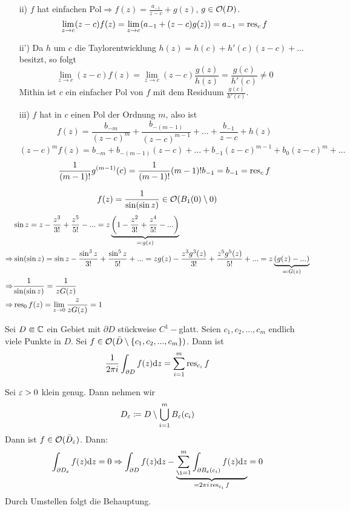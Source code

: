 \begin{beweis}
	\begin{enumerate}
		\item[ii)] $ f $ hat einfachen Pol$ \Rightarrow f(z)=\frac{a_{-1}}{z-c}+g(z) $, $ g\in\mathcal O(D) $.
		\[ \lim_{z\to c}(z-c) f(z)=\lim_{z\to c}(a_{-1}+(z-c)g(z))=a_{-1}=\operatorname{res}_c f \]
		\item[ii')] Da $ h $ um $ c $ die Taylorentwicklung $ h(z)=h(c)+h'(c)(z-c)+... $ besitzt, so folgt
		\[ \lim_{z\to c}(z-c)f(z)=\lim_{z\to c}(z-c)\frac{g(z)}{h(z)}=\frac{g(c)}{h'(c)}\neq 0 \]
		Mithin ist $ c $ ein einfacher Pol von $ f $ mit dem Residuum $ \frac{g(c)}{h'(c)} $.
		\item[iii)] $ f $ hat in $ c $ einen Pol der Ordnung $ m $, also ist
		\[ f(z)=\frac{b_{-m}}{(z-c)^m}+\frac{b_{-(m-1)}}{(z-c)^{m-1}}+...+\frac{b_{-1}}{z-c}+h(z) \]
		\[ (z-c)^m f(z)=b_{-m}+b_{-(m-1)}(z-c)+...+b_{-1}(z-c)^{m-1}+b_0(z-c)^m+... \]
		\[ \frac{1}{(m-1)!}g^{(m-1)}(c)=\frac{1}{(m-1)!}(m-1)!b_{-1}=b_{-1}=\operatorname{res}_c f \]
	\end{enumerate}\vspace{-22pt}
\end{beweis}
\begin{beispiel*}
	\[ f(z)=\frac{1}{\sin(\sin z)}\in\mathcal O(B_1(0)\setminus 0) \]
	\begin{align*} &\sin z=z-\frac{z^3}{3!}+\frac{z^5}{5!}-...=z\underbrace{\left(1-\frac{z^2}{3!}+\frac{z^4}{5!}-...\right)}_{\eqqcolon g(z)}\\\Rightarrow&\sin(\sin z)=\sin z-\frac{\sin^3 z}{3!}+\frac{\sin^5 z}{5!}+...=zg(z)-\frac{z^3g^3(z)}{3!}+\frac{z^5g^5(z)}{5!}+...=z\underbrace{(g(z)-...)}_{\eqqcolon G(z)}\\\Rightarrow&\frac{1}{\sin(\sin z)}=\frac{1}{zG(z)}\\\Rightarrow& \operatorname{res}_0 f(z)=\lim_{z\to 0}\frac{z}{zG(z)}=1 \end{align*}
\end{beispiel*}
\begin{satz}[Residuensatz]
	Sei $ D\Subset\mathbb{C} $ ein Gebiet mit $ \partial D $ st\"uckweise $ C^1- $glatt. Seien $ c_1,c_2,...,c_m $ endlich viele Punkte in $ D $. Sei $ f\in\mathcal O(\bar D\setminus\lbrace c_1,c_2,...,c_m\rbrace) $. Dann ist
	\[ \frac{1}{2\pi i}\int_{\partial D}^{}f(z)\mathrm d z=\sum_{i=1}^{m}\operatorname{res}_{c_i}f \] 
\end{satz}
\begin{beweis}
	Sei $ \varepsilon>0 $ klein genug. Dann nehmen wir \[ D_\varepsilon\coloneqq D\setminus\bigcup_{i=1}^m B_\varepsilon(c_i) \]
	Dann ist $ f\in\mathcal O(\bar D_\varepsilon) $. Dann:
	\[ \int_{\partial D_\e} f(z)\dd z=0\Rightarrow\int_{\partial D}^{}f(z)\dd z-\underbrace{\sum_{\i=1}^{m}\int_{\partial B_\e(c_i)}^{}f(z)\dd z}_{=2\pi i\res_{c_i}f}=0 \]
	Durch Umstellen folgt die Behauptung.
\end{beweis}
